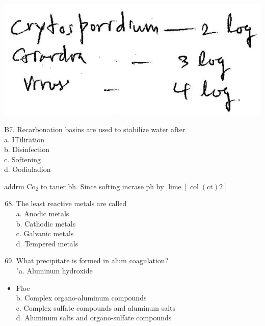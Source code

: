 \documentclass[10pt]{article}
\begin{document}
\includegraphics[max width=\textwidth]{2022_11_11_ca6a6c1a0324ee23e523g-61}

B7. Recarbonation basins are used to stabilize water after\\
a. ITiliration\\
b. Disinfection\\
c. Softening\\
d. Oodiuladion

addrm $\mathrm{Co}_{2}$ to taner bh. Since softing incrase ph by $\operatorname{lime}[\operatorname{col}(\mathrm{ct}) 2]$

\begin{enumerate}
  \setcounter{enumi}{67}
  \item The least reactive metals are called\\
a. Anodic metals\\
b. Cathodic metals\\
c. Galvanic metals\\
d. Tempered metals

  \item What precipitate is formed in alum coagulation?\\
"a. Aluminum hydroxide

\end{enumerate}

\begin{itemize}
  \item Floc\\
b. Complex organo-aluminum compounds\\
c. Complex sulfate compounds and aluminum salts\\
d. Aluminum salts and organo-sulfate compounds
\end{itemize}
\end{document}
